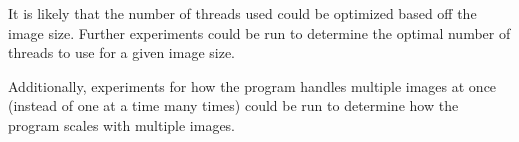 \documentclass{article}
\begin{document}
It is likely that the number of threads used could be optimized based off the image size. Further
experiments could be run to determine the optimal number of threads to use for a given image size.

Additionally, experiments for how the program handles multiple images at once
(instead of one at a time many times) could be run to determine how the program
scales with multiple images.
\end{document}
